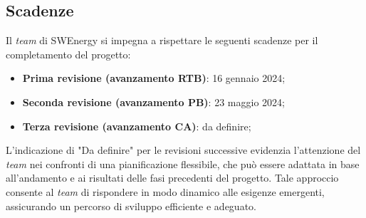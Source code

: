 \subsection{Scadenze}
Il \textit{team} di SWEnergy si impegna a rispettare le seguenti scadenze per il
completamento del progetto:
\begin{itemize}
	\item \textbf{Prima revisione (avanzamento RTB)}: 16 gennaio 2024;
	\item \textbf{Seconda revisione (avanzamento PB)}: 23 maggio 2024;
	\item \textbf{Terza revisione (avanzamento CA)}: da definire;
\end{itemize}

L'indicazione di "Da definire" per le revisioni successive evidenzia l'attenzione
del \textit{team} nei confronti di una pianificazione flessibile, che può essere
adattata in base all'andamento e ai risultati delle fasi precedenti del progetto.
Tale approccio consente al \textit{team} di rispondere in modo dinamico alle esigenze emergenti,
assicurando un percorso di sviluppo efficiente e adeguato.

